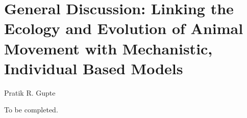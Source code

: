 
{}%
\chapter{General Discussion: Linking the Ecology and Evolution of Animal Movement with Mechanistic, Individual Based Models}\label{ch:discussion}

{{Pratik R. Gupte}}

To be completed.










